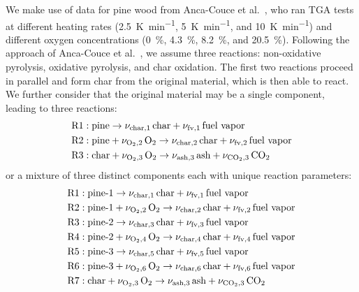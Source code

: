 \documentclass[11pt]{book}
\begin{document}
We make use of data for pine wood from Anca-Couce et al.~\cite{Anca-Couce:2012}, who ran TGA tests at different heating rates (\qty{2.5}{\kelvin\per\minute}, \qty{5}{\kelvin\per\minute}, and \qty{10}{\kelvin\per\minute}) and different oxygen concentrations (\qty{0}{\percent}, \qty{4.3}{\percent}, \qty{8.2}{\percent}, and \qty{20.5}{\percent}). Following the approach of Anca-Couce et al.~\cite{Anca-Couce:2012}, we assume three reactions: non-oxidative pyrolysis, oxidative pyrolysis, and char oxidation. The first two reactions proceed in parallel and form char from the original material, which is then able to react. We further consider that the original material may be a single component, leading to three reactions:
\begin{align}
\mathrm{R1} &: \mbox{pine} \rightarrow \nu_{\rm char,1} \,\mbox{char} + \nu_{\rm fv,1} \,\mbox{fuel vapor} \\
\mathrm{R2} &: \mbox{pine} + \nu_{\rm O_2,2} \, {\rm O_2} \rightarrow \nu_{\rm char,2} \,\mbox{char} + \nu_{\rm fv,2} \,\mbox{fuel vapor} \\
\mathrm{R3} &: \mbox{char} + \nu_{\rm O_2,3}\, {\rm O_2} \rightarrow \nu_{\rm ash,3} \,\mbox{ash} + \nu_{\rm CO_2,3} \, {\rm CO_2}
\end{align}
or a mixture of three distinct components each with unique reaction parameters:
\begin{align}
\mathrm{R1} &: \mbox{pine-1}\rightarrow \nu_{\rm char,1} \,\mbox{char} + \nu_{\rm fv,1} \,\mbox{fuel vapor} \\
\mathrm{R2} &: \mbox{pine-1} + \nu_{\rm O_2,2} \, {\rm O_2} \rightarrow \nu_{\rm char,2} \,\mbox{char} + \nu_{\rm fv,2} \,\mbox{fuel vapor} \\
\mathrm{R3} &: \mbox{pine-2} \rightarrow \nu_{\rm char,3} \,\mbox{char} + \nu_{\rm fv,3} \,\mbox{fuel vapor} \\
\mathrm{R4} &: \mbox{pine-2} + \nu_{\rm O_2,4} \, {\rm O_2} \rightarrow \nu_{\rm char,4} \,\mbox{char} + \nu_{\rm fv,4} \,\mbox{fuel vapor} \\
\mathrm{R5} &: \mbox{pine-3} \rightarrow \nu_{\rm char,5} \,\mbox{char} + \nu_{\rm fv,5} \,\mbox{fuel vapor} \\
\mathrm{R6} &: \mbox{pine-3} + \nu_{\rm O_2,6} \, {\rm O_2} \rightarrow \nu_{\rm char,6} \,\mbox{char} + \nu_{\rm fv,6} \,\mbox{fuel vapor} \\
\mathrm{R7} &: \mbox{char} + \nu_{\rm O_2,3}\,{\rm O_2} \rightarrow \nu_{\rm ash,3} \,\mbox{ash} + \nu_{\rm CO_2,3} \,{\rm CO_2}
\end{align}
\end{document}
